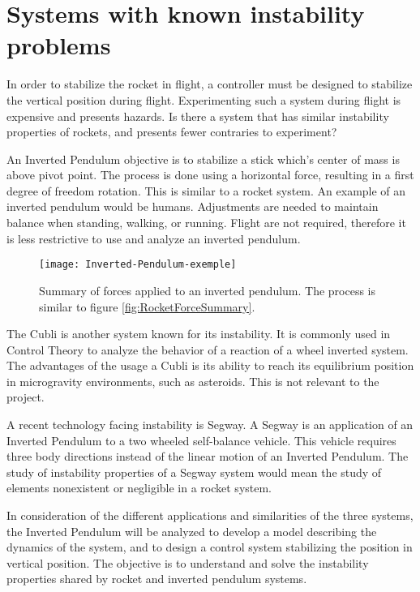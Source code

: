 \section{Systems with known instability problems}

In order to stabilize the rocket in flight, a controller must be designed to stabilize the vertical position during flight. Experimenting such a system during flight is expensive and presents hazards.
Is there a system that has similar instability properties of rockets, and presents fewer contraries to experiment?

An Inverted Pendulum objective is to stabilize a stick which’s center of mass is above pivot point. The process is done using a horizontal force, resulting in a first degree of freedom rotation. This is similar to a rocket system. An example of an inverted pendulum would be humans. Adjustments are needed to maintain balance when standing, walking, or running. Flight are not required, therefore it is less restrictive to use and analyze an inverted pendulum.

\begin{figure}[htbp]
	\centering
	\texttt{[image: Inverted-Pendulum-exemple]}
	\caption{Summary of forces applied to an inverted pendulum. The process is similar to figure  \vref{fig:RocketForceSummary}.}
	\label{fig:InvertedPendulum}
\end{figure}


The Cubli is another system known for its instability. It is commonly used in Control Theory to analyze the behavior of a reaction of a wheel inverted system. The advantages of the usage a Cubli is its ability to reach its equilibrium position in microgravity environments, such as asteroids. This is not relevant to the project.

A recent technology facing instability is Segway. A Segway is an application of an Inverted Pendulum to a two wheeled self-balance vehicle. This vehicle requires three body directions instead of the linear motion of an Inverted Pendulum. The study of instability properties of a Segway system would mean the study of elements nonexistent or negligible in a rocket system.

In consideration of the different applications and similarities of the three systems, the Inverted Pendulum will be analyzed to develop a model describing the dynamics of the system, and to design a control system stabilizing the position in vertical position. The objective is to understand and solve the instability properties shared by rocket and inverted pendulum systems.


